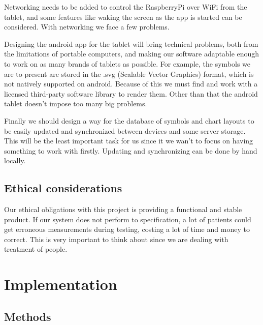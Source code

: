 \documentclass[12pt,a4paper,notitlepage]{report}
\begin{document}
Networking needs to be added to control the RaspberryPi over WiFi from the tablet, and some features like waking the screen as the app is started can be considered. With networking we face a few problems. %

Designing the android app for the tablet will bring technical problems, both from the limitations of portable computers, and making our software adaptable enough to work on as many brands of tablets as possible. For example, the symbols we are to present are stored in the .svg (Scalable Vector Graphics) format, which is not natively supported on android. Because of this we must find and work with a licensed third-party software library to render them. Other than that the android tablet doesn't impose too many big problems. %

Finally we should design a way for the database of symbols and chart layouts to be easily updated and synchronized between devices and some server storage. This will be the least important task for us since it we wan't to focus on having something to work with firstly. Updating and synchronizing can be done by hand locally.

\section{Ethical considerations}

Our ethical obligations with this project is providing a functional and stable product. If our system does not perform to specification, a lot of patients could get erroneous measurements during testing, costing a lot of time and money to correct. This is very important to think about since we are dealing with treatment of people.


\chapter{Implementation}
\section{Methods}

\end{document}
